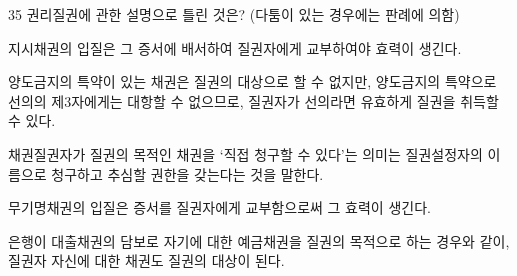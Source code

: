 \begin{question}{35}
권리질권에 관한 설명으로 틀린 것은? (다툼이 있는 경우에는 판례에 의함)
\begin{choices}
  \item 지시채권의 입질은 그 증서에 배서하여 질권자에게 교부하여야 효력이 생긴다.
  \item 양도금지의 특약이 있는 채권은 질권의 대상으로 할 수 없지만, 양도금지의 특약으로 선의의 제3자에게는 대항할 수 없으므로, 질권자가 선의라면 유효하게 질권을 취득할 수 있다.
  \item 채권질권자가 질권의 목적인 채권을 ‘직접 청구할 수 있다’는 의미는 질권설정자의 이름으로 청구하고 추심할 권한을 갖는다는 것을 말한다.
  \item 무기명채권의 입질은 증서를 질권자에게 교부함으로써 그 효력이 생긴다.
  \item 은행이 대출채권의 담보로 자기에 대한 예금채권을 질권의 목적으로 하는 경우와 같이, 질권자 자신에 대한 채권도 질권의 대상이 된다.
\end{choices}
\end{question}
